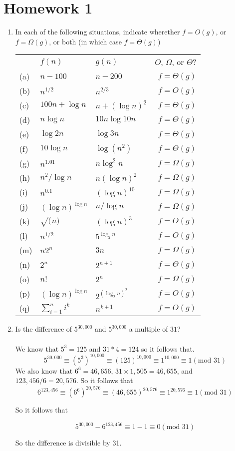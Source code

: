 \documentclass[a4paper,12pt]{article}
\begin{document}
\section*{Homework 1}

\begin{enumerate}
    \item In each of the following situations, indicate wherether $f = O(g)$, or $f = \Omega(g)$, or both (in which case $f = \Theta(g)$)

    \begin{tabular}{lll|r}
      ~ & $f(n)$ & $g(n)$ & $O$, $\Omega$, or $\Theta$?\\
      (a) & $n - 100$ & $n - 200$ & $f = \Theta(g)$ \\
      (b) & $n^{1/2}$ & $n^{2/3}$ & $f = O(g)$\\
      (c) & $100n + \log n$ & $n + (\log n)^2$& $f = \Theta(g)$ \\
      (d) & $n \log n $ & $10n \log 10n$ & $f = \Theta(g)$\\
      (e) & $\log 2n$ & $\log 3n$ & $f = \Theta(g)$ \\
      (f) & $10 \log n$ & $\log(n^2)$ & $f = \Theta(g)$ \\
      (g) & $n^{1.01}$ & $n \log^2 n$ & $f = \Omega(g)$\\
      (h) & $n^2 / \log n$ & $n(\log n)^2$ & $f = \Omega(g)$\\
      (i) & $n^{0.1}$ & $(\log n)^{10}$ & $f = \Omega(g)$\\
      (j) & $(\log n)^{\log n}$ & $n / \log n$ & $f = \Omega(g)$\\
      (k) & $\sqrt(n)$ & $(\log n)^3$ & $f = O(g)$\\
      (l) & $n^{1/2}$ & $5^{\log_2 n}$ & $f = O(g)$\\
      (m) & $n2^n$ & $3n$ & $f = \Omega(g)$\\
      (n) & $2^n$ & $2^{n+1}$ & $f = \Theta(g)$ \\
      (o) & $n!$ & $2^n$ & $f = \Omega(g)$ \\
      (p) & $(\log n)^{\log n}$ & $2^{(\log_2 n)^2}$ & $f = O(g)$ \\
      (q) & $\sum_{i = 1}^n i^k$ & $n^{k+1}$ & $f = O(g)$\\
    \end{tabular}
    \item Is the difference of $5^{30,000}$ and $5^{30,000}$ a multiple of $31$?
    \\\\
    We know that $5^3 = 125$ and $31*4 = 124$ so it follows that.
    $$5^{30,000} \equiv (5^3)^{10,000} \equiv (125)^{10,000} \equiv 1^{10,000} \equiv 1 (\text{mod } 31)$$
    We also know that $6^6 = 46,656$, $31\times 1,505 = 46,655$, and $123,456/6=20,576$. So it follows that
    $$6^{123,456} \equiv (6^6)^{20,576} \equiv (46,655)^{20,576} \equiv 1^{20,576} \equiv 1 (\text{mod } 31)$$

    So it follows that

    $$5^{30,000} - 6^{123,456} \equiv 1 - 1 \equiv 0 (\text{mod } 31)$$

    So the difference is divisible by 31.
\end{enumerate}
\end{document}
